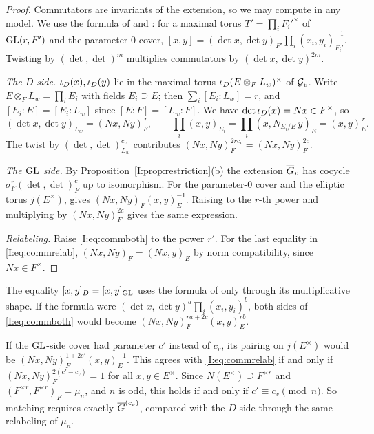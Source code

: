 \begin{proof}
Commutators are invariants of the extension, so we may compute in any model. We use the formula of \cite[\S3]{FK86} and \cite[Prop.~0.1.5]{KP84} \Ev: for a maximal torus $T'=\prod_iF_i'^\times$ of $\mathrm{GL}(r,F')$ and the parameter-$0$ cover, $[x,y]=(\det x,\det y)_{F'}\prod_i(x_i,y_i)_{F_i'}^{-1}$. Twisting by $(\det,\det)^{m}$ multiplies commutators by $(\det x,\det y)^{2m}$.

\emph{The $D$ side.} $\iota_D(x),\iota_D(y)$ lie in the maximal torus $\iota_D(E\otimes_FL_w)^\times$ of $\mathcal{G}_v$. Write $E\otimes_FL_w=\prod_iE_i$ with fields $E_i\supseteq E$; then $\sum_i[E_i:L_w]=r$, and $[E_i:E]=[E_i:L_w]$ since $[E:F]=[L_w:F]$. We have $\det\iota_D(x)=Nx\in F^\times$, so
\[ (\det x,\det y)_{L_w}=(Nx,Ny)_F^{\,r},\qquad \prod_i(x,y)_{E_i}=\prod_i(x,N_{E_i/E}\,y)_E=(x,y)_E^{\,r}. \]
The twist by $(\det,\det)_{L_w}^{c_v}$ contributes $(Nx,Ny)_F^{2rc_v}=(Nx,Ny)_F^{2c}$.

\emph{The $\mathrm{GL}$ side.} By Proposition~\ref{I:prop:restriction}(b) the extension $\overline{G}_v$ has cocycle $\sigma_F^r(\det,\det)_F^c$ up to isomorphism. For the parameter-$0$ cover and the elliptic torus $j(E^\times)$, \cite[\S3]{FK86} gives $(Nx,Ny)_F(x,y)_E^{-1}$. Raising to the $r$-th power and multiplying by $(Nx,Ny)_F^{2c}$ gives the same expression.

\emph{Relabeling.} Raise \eqref{I:eq:commboth} to the power $r'$. For the last equality in \eqref{I:eq:commrelab}, $(Nx,Ny)_F=(Nx,y)_E$ by norm compatibility, since $Nx\in F^\times$.
\end{proof}

\begin{remark}\label{I:rem:robust}
The equality $[x,y]_D=[x,y]_{\mathrm{GL}}$ uses the formula of \cite[\S3]{FK86} only through its multiplicative shape. If the formula were $(\det x,\det y)^{a}\prod_i(x_i,y_i)^{b}$, both sides of \eqref{I:eq:commboth} would become $(Nx,Ny)_F^{ra+2c}(x,y)_E^{rb}$.
\end{remark}

\begin{remark}\label{I:rem:forced}
If the $\mathrm{GL}$-side cover had parameter $c'$ instead of $c_v$, its pairing on $j(E^\times)$ would be $(Nx,Ny)_F^{1+2c'}(x,y)_E^{-1}$. This agrees with \eqref{I:eq:commrelab} if and only if $(Nx,Ny)_F^{2(c'-c_v)}=1$ for all $x,y\in E^\times$. Since $N(E^\times)\supseteq F^{\times r}$ and $(F^{\times r},F^{\times r})_F=\mu_n$, and $n$ is odd, this holds if and only if $c'\equiv c_v\pmod n$. So matching requires exactly $\overline{G}^{(c_v)}$, compared with the $D$ side through the same relabeling of $\mu_n$.
\end{remark}

